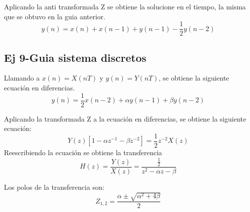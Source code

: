 \documentclass[../../guia1.tex]{subfiles}
\begin{document}
Aplicando la anti transformada Z se obtiene la solucione en el tiempo, la misma que se obtuvo en la guia anterior.
\begin{equation}
y(n)=x(n)+x(n-1)+y(n-1)-\frac{1}{2}y(n-2)
\end{equation}

\subsection*{Ej 9-Guia sistema discretos}
Llamando a $x(n)=X(nT)$ y $y(n)=Y(nT)$, se obtiene la siguiente ecuación en diferencias. 
\begin{equation}
y(n)=\frac{1}{2} x(n-2) + \alpha y(n-1) + \beta y(n-2)  
\end{equation}

Aplicando la transformada Z a la ecuación en diferencias, se obtiene la siguiente ecuación:
\begin{equation}
Y(z)\left[ 1 - \alpha z^{-1} - \beta z^{-2} \right] = \frac{1}{2} z^{-2} X(z)
\end{equation}
Reescribiendo la ecuación se obtiene la transferencia
\begin{equation}
H(z)=\frac{Y(z)}{X(z)}=\frac{\frac{1}{2}}{z^{2} - \alpha z - \beta }
\end{equation}

Los polos de la transferencia son:
\begin{equation}
Z_{1,2}=\frac{\alpha \pm \sqrt{\alpha ^ 2 + 4 \beta}  }{2}
\end{equation}
\end{document}
